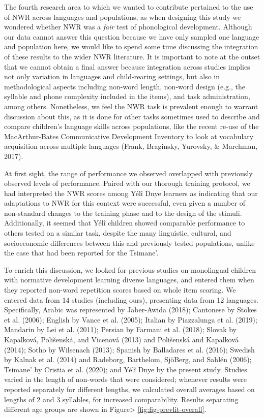 \documentclass[english,,man,floatsintext]{apa6}
\begin{document}
The fourth research area to which we wanted to contribute pertained to the use of NWR across languages and populations, as when designing this study we wondered whether NWR was a \emph{fair} test of phonological development. Although our data cannot answer this question because we have only sampled one language and population here, we would like to spend some time discussing the integration of these results to the wider NWR literature. It is important to note at the outset that we cannot obtain a final answer because integration across studies implies not only variation in languages and child-rearing settings, but also in methodological aspects including non-word length, non-word design (e.g., the syllable and phone complexity included in the items), and task administration, among others. Nonetheless, we feel the NWR task is prevalent enough to warrant discussion about this, as it is done for other tasks sometimes used to describe and compare children's language skills across populations, like the recent re-use of the MacArthur-Bates Communicative Development Inventory to look at vocabulary acquisition across multiple languages (Frank, Braginsky, Yurovsky, \& Marchman, 2017).

At first sight, the range of performance we observed overlapped with previously observed levels of performance. Paired with our thorough training protocol, we had interpreted the NWR scores among Yélî Dnye learners as indicating that our adaptations to NWR for this context were successful, even given a number of non-standard changes to the training phase and to the design of the stimuli. Additionally, it seemed that Yélî children showed comparable performance to others tested on a similar task, despite the many linguistic, cultural, and socioeconomic differences between this and previously tested populations, unlike the case that had been reported for the Tsimane'.

To enrich this discussion, we looked for previous studies on monolingual children with normative development learning diverse languages, and entered them when they reported non-word repetition scores based on whole item scoring. We entered data from 14 studies (including ours), presenting data from 12 languages. Specifically, Arabic was represented by Jaber-Awida (2018); Cantonese by Stokes et al. (2006); English by Vance et al. (2005); Italian by Piazzalunga et al. (2019); Mandarin by Lei et al. (2011); Persian by Farmani et al. (2018); Slovak by Kapalková, Polišenská, and Vicenová (2013) and Polišenská and Kapalková (2014); Sotho by Wilsenach (2013); Spanish by Balladares et al. (2016); Swedish by Kalnak et al. (2014) and Radeborg, Barthelom, SjöBerg, and Sahlén (2006); Tsimane' by Cristia et al. (2020); and Yélî Dnye by the present study. Studies varied in the length of non-words that were considered; whenever results were reported separately for different lengths, we calculated overall averages based on lengths of 2 and 3 syllables, for increased comparability. Results separating different age groups are shown in Figure\textgreater{} \ref{fig:fig-prevlit-overall}.
\end{document}
